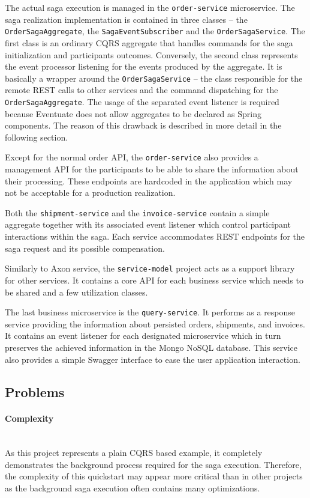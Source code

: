 \documentclass[oneside,
  digital, %
  table,   %
  lof,     %
  lot,     %
]{fithesis3}
\newcommand{\newlinepar}[1]{\paragraph{#1}\needspace{3\baselineskip}\mbox{}\\}
\begin{document}
The actual saga execution is managed in the \texttt{order-service} microservice. The saga realization implementation is contained in three classes -- the \texttt{OrderSagaAggregate}, the \texttt{SagaEventSubscriber} and the \texttt{OrderSagaService}. The first class is an ordinary CQRS aggregate that handles commands for the saga initialization and participants outcomes. Conversely, the second class represents the event processor listening for the events produced by the aggregate. It is basically a wrapper around the \texttt{OrderSagaService} -- the class responsible for the remote REST calls to other services and the command dispatching for the \texttt{OrderSagaAggregate}. The usage of the separated event listener is required because Eventuate does not allow aggregates to be declared as Spring components. The reason of this drawback is described in more detail in the following section.

Except for the normal order API, the \texttt{order-service} also provides a management API for the participants to be able to share the information about their processing. These endpoints are hardcoded in the application which may not be acceptable for a production realization.

Both the \texttt{shipment-service} and the \texttt{invoice-service} contain a simple aggregate together with its associated event listener which control participant interactions within the saga. Each service accommodates REST endpoints for the saga request and its possible compensation.

Similarly to Axon service, the \texttt{service-model} project acts as a support library for other services. It contains a core API for each business service which needs to be shared and a few utilization classes.

The last business microservice is the \texttt{query-service}. It performs as a response service providing the information about persisted orders, shipments, and invoices. It contains an event listener for each designated microservice which in turn preserves the achieved information in the Mongo NoSQL database. This service also provides a simple Swagger interface to ease the user application interaction.

\subsection{Problems}

\newlinepar{Complexity}

As this project represents a plain CQRS based example, it completely demonstrates the background process required for the saga execution. Therefore, the complexity of this quickstart may appear more critical than in other projects as the background saga execution often contains many optimizations.
\end{document}

